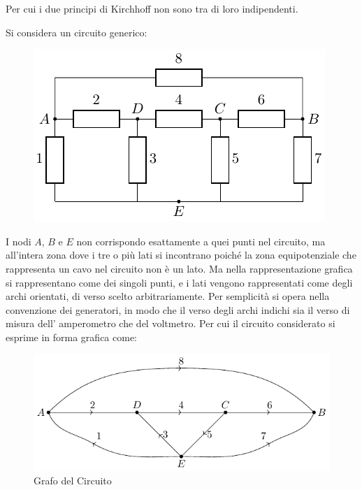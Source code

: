 \documentclass{article}
\numberwithin{equation}{subsection}
\begin{document}
Per cui i due principi di Kirchhoff non sono tra di loro indipendenti. 


Si considera un circuito generico:
\begin{figure}[H]%
    \centering
    \includegraphics{circuito-generico.pdf}
    \label{fig:circuito-generico}
\end{figure}
I nodi $A$, $B$ e $E$ non corrispondo esattamente a quei punti nel circuito, ma all'intera zona dove i tre o più lati si incontrano poiché la zona equipotenziale che 
rappresenta un cavo nel circuito non è un lato. Ma nella rappresentazione grafica si rappresentano come dei singoli punti, e i lati vengono rappresentati come degli archi 
orientati, di verso scelto arbitrariamente. Per semplicità si opera nella convenzione dei generatori, in modo che il verso degli archi indichi sia il verso di misura dell'
amperometro che del voltmetro. Per cui il circuito considerato si esprime in forma grafica come:
\begin{figure}[H]%
    \centering
    \includegraphics{grafo-circuito-generico.pdf}
    \caption{Grafo del Circuito}
    \label{fig:grafo-circuito-generico}
\end{figure}
\end{document}
